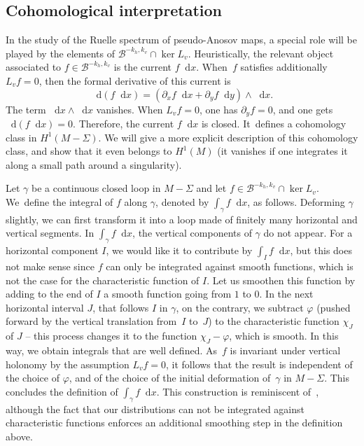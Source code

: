 \documentclass[10pt]{amsart}
\newcommand{\boB}{\mathcal{B}}
\newcommand{\dd}{\mathop{}\!\mathrm{d}}
\let\phi\varphi
\theoremstyle{definition}
\numberwithin{equation}{section}
\begin{document}
\subsection{Cohomological interpretation}
\label{subsec:cohomological}

In the study of the Ruelle spectrum of pseudo-Anosov maps, a special role
will be played by the elements of $\boB^{-k_h, k_v} \cap \ker L_v$.
Heuristically, the relevant object associated to $f \in \boB^{-k_h, k_v}$ is
the current $f \dd x$. When~$f$ satisfies additionally $L_v f = 0$, then the
formal derivative of this current is
\[
\dd (f \dd x)=(\partial_x f \dd x +
\partial_y f \dd y) \wedge \dd x.
\]
The term $\dd x \wedge \dd x$ vanishes.
When $L_v f = 0$, one has $\partial_y f = 0$, and one gets $\dd (f \dd x)=0$.
Therefore, the current $f \dd x$ is closed. It~defines a cohomology class in
$H^1(M-\Sigma)$. We will give a more explicit description of this cohomology
class, and show that it even belongs to $H^1(M)$ (\ie it vanishes if one
integrates it along a small path around a singularity).

Let $\gamma$ be a continuous closed loop in $M-\Sigma$ and let $f \in
\boB^{-k_h, k_v} \cap \ker L_v$. We~define the integral of $f$ along
$\gamma$, denoted by $\int_\gamma f \dd x$, as follows. Deforming $\gamma$
slightly, we can first transform it into a loop made of finitely many
horizontal and vertical segments. In $\int_\gamma f \dd x$, the vertical
components of $\gamma$ do not appear. For a horizontal component $I$, we
would like it to contribute by $\int_I f \dd x$, but this does not make sense
since $f$ can only be integrated against smooth functions, which is not the
case for the characteristic function of $I$. Let us smoothen this function by
adding to the end of $I$ a smooth function going from $1$ to $0$. In the next
horizontal interval $J$, that follows $I$ in $\gamma$, on the contrary, we
subtract $\phi$ (pushed forward by the vertical translation from~$I$ to~$J$)
to the characteristic function $\chi_J$ of $J$ -- this process changes it to
the function $\chi_J - \phi$, which is smooth. In this way, we obtain
integrals that are well defined. As~$f$ is invariant under vertical holonomy
by the assumption $L_v f = 0$, it follows that the result is independent of
the choice of $\phi$, and of the choice of the initial deformation of~$\gamma$ in $M-\Sigma$. This concludes the definition of $\int_\gamma f \dd
x$. This construction is reminiscent
of~\cite[\S1.3]{bufetov_translation_flow}, although the fact that our
distributions can not be integrated against characteristic functions enforces
an additional smoothing step in the definition above.
\end{document}
